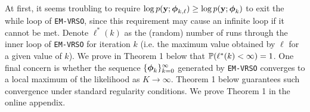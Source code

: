 
At first, it seems troubling to require $\log p(\mathbf{y};\boldsymbol{\phi}_{k,\ell}) \geq \log p(\mathbf{y};\boldsymbol{\phi}_{k})$ to exit the while loop of \texttt{EM-VRSO}, since this requirement may cause an infinite loop if it cannot be met. %
Denote $\ell^*(k)$ as the (random) number of runs through the inner loop of \texttt{EM-VRSO} for iteration $k$ (i.e. the maximum value obtained by $\ell$ for a given value of $k$). We prove in Theorem 1 below that 
$\mathbb{P}(\ell^*(k) < \infty) = 1$. %
%
One final concern is whether the sequence $\{\boldsymbol{\phi}_{k}\}_{k=0}^\infty$ generated by \texttt{EM-VRSO} converges to a local maximum of the likelihood as $K \to \infty$. %
Theorem 1 below guarantees such convergence under standard regularity conditions. We prove Theorem 1 in the online appendix. %

    
